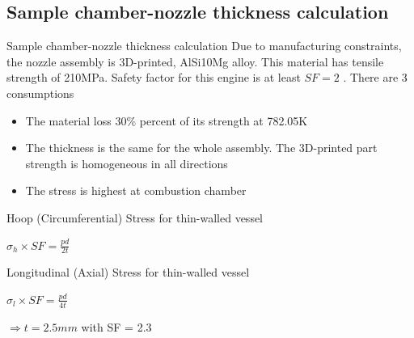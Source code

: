 \documentclass{beamer}
\begin{document}
\subsection{Sample chamber-nozzle thickness calculation}
\begin{frame}{Sample chamber-nozzle thickness calculation}
    Due to manufacturing constraints, the nozzle assembly is 3D-printed, AlSi10Mg alloy. This material has tensile strength of 210MPa. Safety factor for this engine is at least $SF=2$ . There are 3 consumptions 
    \begin{itemize}
        \item The material loss 30\% percent of its strength at 782.05K
        \item The thickness is the same for the whole assembly. The 3D-printed part strength is homogeneous in all directions
        \item The stress is highest at combustion chamber
    \end{itemize}
    Hoop (Circumferential) Stress for thin-walled vessel
    \begin{center}
        $\sigma_h \times SF = \frac{pd}{2t}$
    \end{center}
    Longitudinal (Axial) Stress for thin-walled vessel \\
    \begin{center}
        $\sigma_l \times SF = \frac{pd}{4t}$
    \end{center}
    $\Rightarrow{t = 2.5mm}$ with SF = 2.3
\end{frame}
\end{document}
